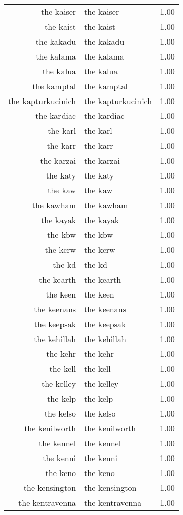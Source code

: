 \begin{table}[ht]
\begin{tabular}{rlr}
  the kaiser & the kaiser & 1.00 \\ 
  the kaist & the kaist & 1.00 \\ 
  the kakadu & the kakadu & 1.00 \\ 
  the kalama & the kalama & 1.00 \\ 
  the kalua & the kalua & 1.00 \\ 
  the kamptal & the kamptal & 1.00 \\ 
  the kapturkucinich & the kapturkucinich & 1.00 \\ 
  the kardiac & the kardiac & 1.00 \\ 
  the karl & the karl & 1.00 \\ 
  the karr & the karr & 1.00 \\ 
  the karzai & the karzai & 1.00 \\ 
  the katy & the katy & 1.00 \\ 
  the kaw & the kaw & 1.00 \\ 
  the kawham & the kawham & 1.00 \\ 
  the kayak & the kayak & 1.00 \\ 
  the kbw & the kbw & 1.00 \\ 
  the kcrw & the kcrw & 1.00 \\ 
  the kd & the kd & 1.00 \\ 
  the kearth & the kearth & 1.00 \\ 
  the keen & the keen & 1.00 \\ 
  the keenans & the keenans & 1.00 \\ 
  the keepsak & the keepsak & 1.00 \\ 
  the kehillah & the kehillah & 1.00 \\ 
  the kehr & the kehr & 1.00 \\ 
  the kell & the kell & 1.00 \\ 
  the kelley & the kelley & 1.00 \\ 
  the kelp & the kelp & 1.00 \\ 
  the kelso & the kelso & 1.00 \\ 
  the kenilworth & the kenilworth & 1.00 \\ 
  the kennel & the kennel & 1.00 \\ 
  the kenni & the kenni & 1.00 \\ 
  the keno & the keno & 1.00 \\ 
  the kensington & the kensington & 1.00 \\ 
  the kentravenna & the kentravenna & 1.00 \\ 

\end{tabular}
\end{table}
